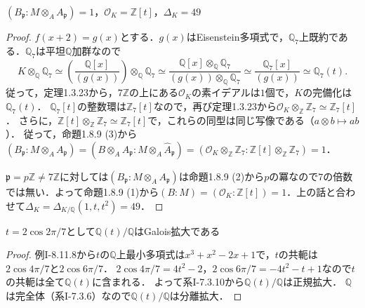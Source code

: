 \begin{screen}
  $(B_\mathfrak{p}:M\otimes_AA_\mathfrak{p})=1$，$\mathcal{O}_K=\mathbb{Z}[t]$，$\varDelta_K=49$
\end{screen}
\begin{proof}
  $f(x+2) = g(x)$とする．$g(x)$はEisenstein多項式で，$\mathbb{Q}_7$上既約である．$\mathbb{Q}_7$は平坦$\mathbb{Q}$加群なので
  \[ K \otimes_\mathbb{Q} \mathbb{Q}_7 \simeq \left( \frac{\mathbb{Q}[x]}{(g(x))} \right) \otimes_\mathbb{Q} \mathbb{Q}_7 \simeq \frac{\mathbb{Q}[x] \otimes_\mathbb{Q} \mathbb{Q}_7}{(g(x)) \otimes_\mathbb{Q} \mathbb{Q}_7} \simeq \frac{\mathbb{Q}_7[x]}{(g(x))} \simeq \mathbb{Q}_7(t). \]
  従って，定理1.3.23から，$7\mathbb{Z}$の上にある$\mathcal{O}_K$の素イデアルは$1$個で，$K$の完備化は$\mathbb{Q}_7(t)$．
  $\mathbb{Q}_7[t]$の整数環は$\mathbb{Z}_7[t]$なので，再び定理1.3.23から$\mathcal{O}_K\otimes_\mathbb{Z}\mathbb{Z}_7\simeq\mathbb{Z}_7[t]$．
  さらに，$\mathbb{Z}[t]\otimes_\mathbb{Z}\mathbb{Z}_7 \simeq \mathbb{Z}_7[t]$で，これらの同型は同じ写像である（$a \otimes b \mapsto ab$）．
  従って，命題1.8.9 (3)から$(B_\mathfrak{p}:M\otimes_AA_\mathfrak{p}) = (B\otimes_A\widehat{A}_\mathfrak{p}:M\otimes_A\widehat{A}_\mathfrak{p}) = (\mathcal{O}_K\otimes_\mathbb{Z}\mathbb{Z}_7:\mathbb{Z}[t]\otimes_\mathbb{Z}\mathbb{Z}_7) = 1$．

  $\mathfrak{p}=p\mathbb{Z}\neq7\mathbb{Z}$に対しては$(B_\mathfrak{p}:M\otimes_AA_\mathfrak{p})$は命題1.8.9 (2)から$p$の冪なので$7$の倍数では無い．よって命題1.8.9 (1)から$(B:M)=(\mathcal{O}_K:\mathbb{Z}[t])=1$．上の話と合わせて$\varDelta_K=\varDelta_{K/\mathbb{Q}}(1, t, t^2)=49$．
\end{proof}

\begin{screen}
  $t=2\cos2\pi/7$として$\mathbb{Q}(t)/\mathbb{Q}$はGalois拡大である
\end{screen}
\begin{proof}
  例I-8.11.8から$t$の$\mathbb{Q}$上最小多項式は$x^3+x^2-2x+1$で，$t$の共軛は$2\cos4\pi/7$と$2\cos6\pi/7$．
  $2\cos4\pi/7=4t^2-2$，$2\cos6\pi/7=-4t^2-t+1$なので$t$の共軛は全て$\mathbb{Q}(t)$に含まれる．
  よって系I-7.3.10から$\mathbb{Q}(t)/\mathbb{Q}$は正規拡大．
  $\mathbb{Q}$は完全体（系I-7.3.6）なので$\mathbb{Q}(t)/\mathbb{Q}$は分離拡大．
\end{proof}


